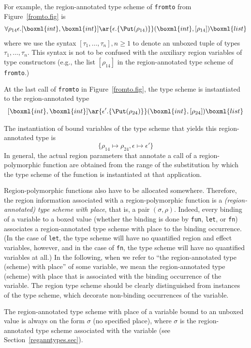 \documentclass[12pt]{book}
\begin{document}
For example, the region-annotated type scheme of {\tt fromto} from
Figure~\ref{fromto.fig} is
$$\forall\rho_{14}\epsilon. [\boxml{int}, \boxml{int} ]
\ar{\epsilon.\{\Put(\rho_{14})\}} (\boxml{int},[\rho_{14}])\boxml{list}$$
where we use the syntax $[\tau_1, \ldots, \tau_n], n \geq 1$ to denote
an unboxed tuple of types $\tau_1, \ldots,\tau_n$. This syntax is not
to be confused with the auxiliary region variables of type
constructors (e.g., the list $[\rho_{14}]$ in the region-annotated type
scheme of {\tt fromto}.)

At the last call of {\tt fromto} in Figure~\ref{fromto.fig},
the type scheme is instantiated to the region-annotated type
$$[\boxml{int}, \boxml{int}] \ar{\epsilon'.\{\Put(\rho_{24})\}}
(\boxml{int},[\rho_{24}])\boxml{list}$$

The instantiation of bound variables of the type scheme that yields
this region-annotated type is
$$\{\rho_{14}\mapsto\rho_{24}, \epsilon\mapsto\epsilon'\}$$
In general,
the actual region parameters that annotate a call of a
region-polymorphic function are obtained from the range of the
substitution by which the type scheme of the function is instantiated
at that application.

%
%
Region-polymorphic functions also have to be allocated somewhere.
Therefore, the region information associated with a region-polymorphic
function is a {\em (region-annotated) type scheme with place}, that
is, a pair $(\sigma,\rho)$.  Indeed, every binding of a variable to a
boxed value (whether the binding is done by {\tt fun}, {\tt let}, or
{\tt fn}) associates a region-annotated type scheme with place to the
binding occurrence.  (In the case of {\tt let}, the type scheme will
have no quantified region and effect variables, however, and in the
case of {\tt fn}, the type scheme will have no quantified variables at
all.)  In the following, when we refer to ``the region-annotated type
(scheme) with place'' of some variable, we mean the region-annotated
type (scheme) with place that is associated with the binding
occurrence of the variable. The region type scheme should be clearly
distinguished from instances of the type scheme, which decorate
non-binding occurrences of the variable.

The region-annotated type scheme with place of a variable bound to an
unboxed value is always on the form $\sigma$ (no specified place), where
$\sigma$ is the region-annotated type scheme associated with the
variable (see Section~\ref{reganntypes.sec}).
\end{document}

